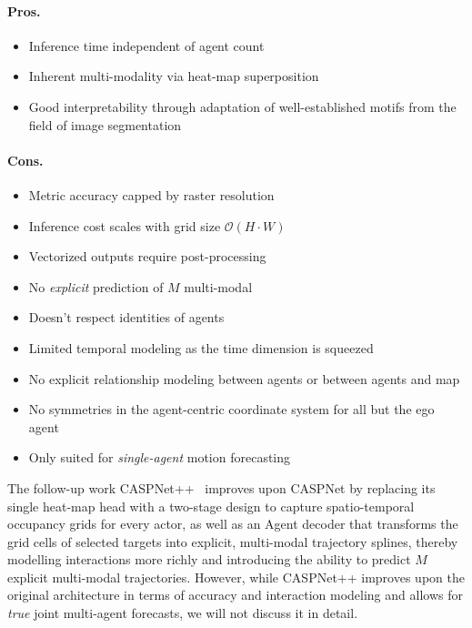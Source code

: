 \begin{description}[leftmargin=1em,itemsep=2pt]
\paragraph{Pros.}
\begin{itemize}[leftmargin=*, label=\greenoplus]
  \item Inference time independent of agent count
  \item Inherent multi-modality via heat-map superposition
  \item Good interpretability through adaptation of well-established motifs from the field of image segmentation
\end{itemize}

\paragraph{Cons.}
\begin{itemize}[leftmargin=*, label=\redominus]
  \item Metric accuracy capped by raster resolution
  \item Inference cost scales with grid size \( \mathcal{O}(H \cdot W) \)
  \item Vectorized outputs require post-processing
  \item No \emph{explicit} prediction of \( M \) multi-modal
  \item Doesn't respect identities of agents
  \item Limited temporal modeling as the time dimension is squeezed
  \item No explicit relationship modeling between agents or between agents and map
  \item No symmetries in the agent-centric coordinate system for all but the ego agent
  \item Only suited for \emph{single-agent} motion forecasting
\end{itemize}

The follow-up work CASPNet++~\cite{caspnetppSchäfer2023} improves upon CASPNet by replacing its single heat-map head with a two-stage design to capture spatio-temporal occupancy grids for every actor, as well as an Agent decoder that transforms the grid cells of selected targets into explicit, multi-modal trajectory splines, thereby modelling interactions more richly and introducing the ability to predict \( M \) explicit multi-modal trajectories. However, while CASPNet++ improves upon the original architecture in terms of accuracy and interaction modeling and allows for \emph{true} joint multi-agent forecasts, we will not discuss it in detail.


\end{description}
